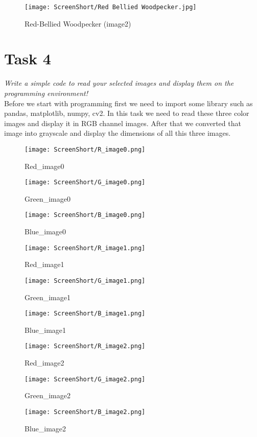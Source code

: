 \documentclass[conference,12pt]{IEEEtran}
\begin{document}
\begin{figure}[h!]
    \centering
    \texttt{[image: ScreenShort/Red Bellied Woodpecker.jpg]}
    \caption{Red-Bellied Woodpecker (image2)}
\end{figure}

\section{Task 4}
\textit{Write a simple code to read your selected images and display them on the programming environment!}\\
Before we start with programming first we need to import some library such as pandas, matplotlib, numpy, cv2. In this task we need to read these three color images and display it in RGB channel images. After that we converted that image into grayscale and display the dimensions of all this three images.
\begin{figure}[h!]
    \centering
\texttt{[image: ScreenShort/R\_image0.png]}
    \caption{Red\_image0}
\end{figure}
\begin{figure}[h!]
    \centering
    \texttt{[image: ScreenShort/G\_image0.png]}
    \caption{Green\_image0}
\end{figure}
\begin{figure}[h!]
    \centering
    \texttt{[image: ScreenShort/B\_image0.png]}
    \caption{Blue\_image0}
\end{figure}

\begin{figure}[h!]
    \centering
    \texttt{[image: ScreenShort/R\_image1.png]}
    \caption{Red\_image1}
\end{figure}
\begin{figure}[h!]
    \centering
    \texttt{[image: ScreenShort/G\_image1.png]}
    \caption{Green\_image1}
\end{figure}
\begin{figure}[h!]
    \centering
    \texttt{[image: ScreenShort/B\_image1.png]}
    \caption{Blue\_image1}
\end{figure}

\begin{figure}[h!]
    \centering
    \texttt{[image: ScreenShort/R\_image2.png]}
    \caption{Red\_image2}
\end{figure}
\begin{figure}[h!]
    \centering
    \texttt{[image: ScreenShort/G\_image2.png]}
    \caption{Green\_image2}
\end{figure}
\begin{figure}[h!]
    \centering
    \texttt{[image: ScreenShort/B\_image2.png]}
    \caption{Blue\_image2}
\end{figure}
\end{document}
